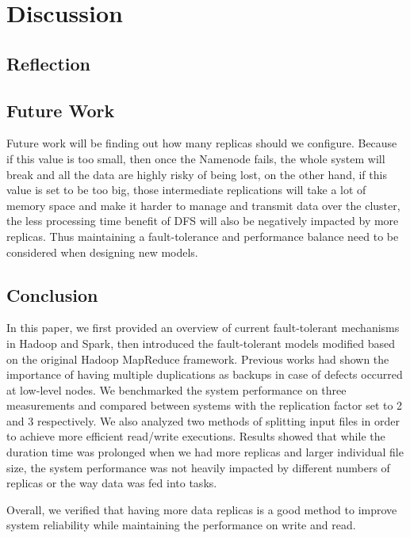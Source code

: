 \documentclass[11pt,twocolumn]{article}
\begin{document}
\section{Discussion}
\subsection*{Reflection}
\subsection*{Future Work}
Future work will be finding out how many replicas should we configure. Because if this value is too small, then once the Namenode fails, the whole system will break and all the data are highly risky of being lost, on the other hand, if this value is set to be too big, those intermediate replications will take a lot of memory space and make it harder to manage and transmit data over the cluster, the less processing time benefit of DFS will also be negatively impacted by more replicas. Thus maintaining a fault-tolerance and performance balance need to be considered when designing new models. 
\subsection*{Conclusion}
In this paper, we first provided an overview of current fault-tolerant mechanisms in Hadoop and Spark, then introduced the fault-tolerant models modified based on the original Hadoop MapReduce framework. Previous works had shown the importance of having multiple duplications as backups in case of defects occurred at low-level nodes. We benchmarked the system performance on three measurements and compared between systems with the replication factor set to 2 and 3 respectively. We also analyzed two methods of splitting input files in order to achieve more efficient read/write executions. Results showed that while the duration time was prolonged when we had more replicas and larger individual file size, the system performance was not heavily impacted by different numbers of replicas or the way data was fed into tasks.\par

Overall, we verified that having more data replicas is a good method to improve system reliability while maintaining the performance on write and read. 


\end{document}
